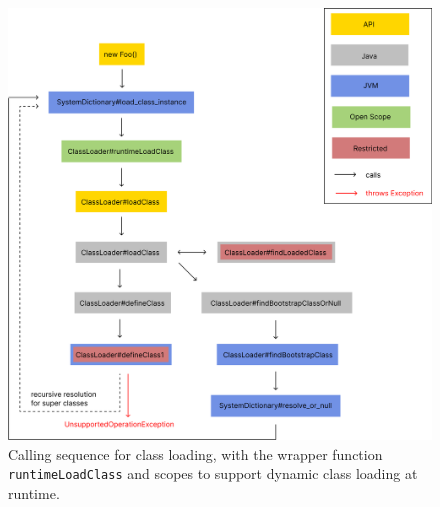 

\begin{figure}
    \centering
    \includegraphics[scale=0.5]{resources/Group 403.png}
    \caption{Calling sequence for class loading, with the wrapper function \texttt{runtimeLoadClass} and scopes to support dynamic class loading at runtime.}
    \label{fig:load_class}
\end{figure}

